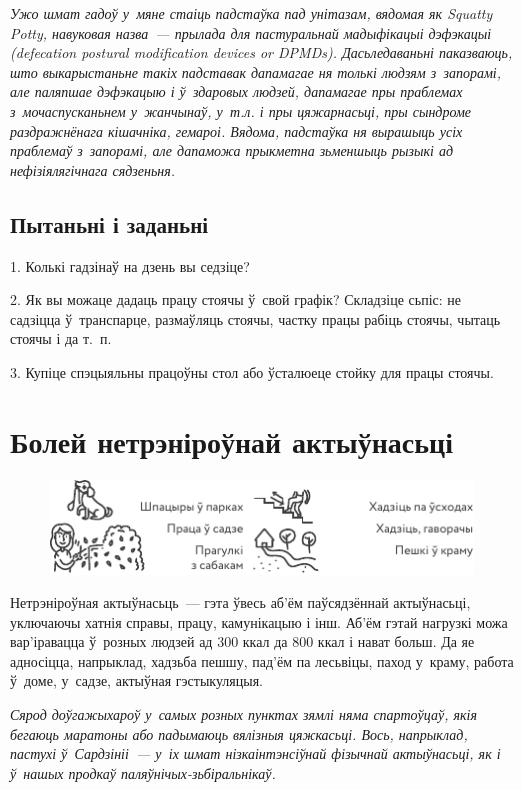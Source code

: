 \emph{Ужо шмат гадоў у~мяне стаіць падстаўка пад унітазам, вядомая як Squatty Potty, навуковая назва~--- прылада для пастуральнай мадыфікацыі дэфэкацыі (defecation postural modification devices or DPMDs). Дасьледаваньні паказваюць, што выкарыстаньне такіх падставак дапамагае ня толькі людзям з~запорамі, але паляпшае дэфэкацыю і ў~здаровых людзей, дапамагае пры праблемах з~мочаспусканьнем у~жанчынаў, у~т.л. і пры цяжарнасьці, пры сындроме раздражнёнага кішачніка, гемароі. Вядома, падстаўка ня вырашыць усіх праблемаў з~запорамі, але дапаможа прыкметна зьменшыць рызыкі ад нефізіялягічнага сядзеньня.}

\subsection*{Пытаньні і заданьні}

1. Колькі гадзінаў на дзень вы седзіце?

2. Як вы можаце дадаць працу стоячы ў~свой графік? Складзіце сьпіс: не садзіцца ў~транспарце, размаўляць стоячы, частку працы рабіць стоячы, чытаць стоячы і да т.~п.

3. Купіце спэцыяльны працоўны стол або ўсталюеце стойку для працы стоячы.


\section{Болей нетрэніроўнай актыўнасьці}

\begin{figure}[htb!]
  \centering
  \includegraphics[scale=1.5]{willpower/ch5/7.pdf}
\end{figure}

Нетрэніроўная актыўнасьць~--- гэта ўвесь аб'ём паўсядзённай актыўнасьці, уключаючы хатнія справы, працу, камунікацыю і інш. Аб'ём гэтай нагрузкі можа вар'іравацца ў~розных людзей ад 300 ккал да 800 ккал і нават больш. Да яе адносіцца, напрыклад, хадзьба пешшу, пад'ём па лесьвіцы, паход у~краму, работа ў~доме, у~садзе, актыўная гэстыкуляцыя.

\emph{Сярод доўгажыхароў у~самых розных пунктах зямлі няма спартоўцаў, якія бегаюць маратоны або падымаюць вялізныя цяжкасьці. Вось, напрыклад, пастухі ў~Сардзініі~--- у~іх шмат нізкаінтэнсіўнай фізычнай актыўнасьці, як і ў~нашых продкаў паляўнічых-зьбіральнікаў.}

